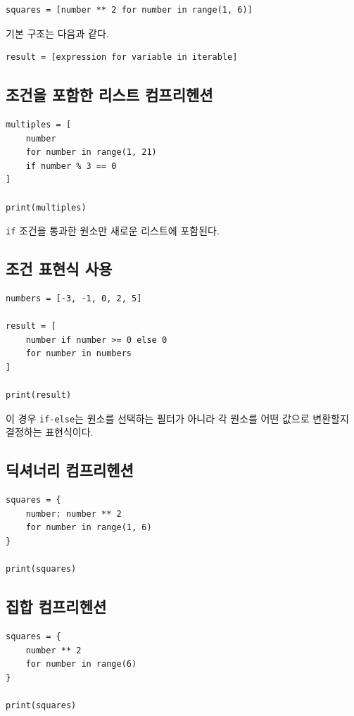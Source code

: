 \documentclass[11pt,a4paper]{article}
\begin{document}
\begin{lstlisting}
squares = [number ** 2 for number in range(1, 6)]
\end{lstlisting}

기본 구조는 다음과 같다.

\begin{lstlisting}
result = [expression for variable in iterable]
\end{lstlisting}

\subsection{조건을 포함한 리스트 컴프리헨션}

\begin{lstlisting}
multiples = [
    number
    for number in range(1, 21)
    if number % 3 == 0
]

print(multiples)
\end{lstlisting}

\texttt{if} 조건을 통과한 원소만 새로운 리스트에 포함된다.

\subsection{조건 표현식 사용}

\begin{lstlisting}
numbers = [-3, -1, 0, 2, 5]

result = [
    number if number >= 0 else 0
    for number in numbers
]

print(result)
\end{lstlisting}

이 경우 \texttt{if-else}는 원소를 선택하는 필터가 아니라 각 원소를 어떤 값으로 변환할지 결정하는 표현식이다.

\subsection{딕셔너리 컴프리헨션}

\begin{lstlisting}
squares = {
    number: number ** 2
    for number in range(1, 6)
}

print(squares)
\end{lstlisting}

\subsection{집합 컴프리헨션}

\begin{lstlisting}
squares = {
    number ** 2
    for number in range(6)
}

print(squares)
\end{lstlisting}
\end{document}
